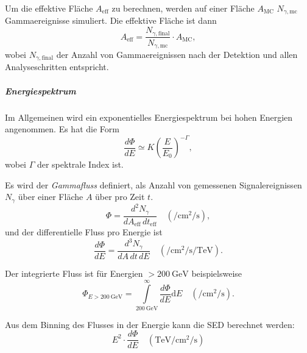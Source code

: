 Um die effektive Fläche $A_{\text{eff}}$ zu berechnen,
werden auf einer Fläche $A_{\text{MC}}$ $N_{\gamma,\text{mc}}$ Gammaereignisse simuliert.
Die effektive Fläche ist dann
\begin{equation}%
  \label{eq:effective_area}
  A_{\text{eff}} =
    \frac{N_{\gamma,\text{final}}}{N_{\gamma,\text{mc}}}
    \cdot A_{\text{MC}} ,
\end{equation}
wobei $N_{\gamma,\text{final}}$ der Anzahl von Gammaereignissen nach der Detektion
und allen Analyseschritten entspricht.



\subparagraph{Energiespektrum}

Im Allgemeinen wird ein exponentielles Energiespektrum bei hohen Energien
angenommen. 
Es hat die Form 
\begin{equation}%
  \label{eq:photon_index}
  \frac{d\Phi}{dE} \simeq K {\left(\frac{E}{E_0}\right)}^{-\Gamma},
\end{equation}
wobei $\Gamma$ der spektrale Index ist.

Es wird der \textit{Gammafluss} definiert,
als Anzahl von gemessenen Signalereignissen $N_{\gamma}$
über
einer Fläche $A$ über pro Zeit $t$.
\begin{equation}%
  \label{eq:gamma_flux}
  \Phi = \frac{d^2 N_{\gamma}}{dA_{\text{eff}}\, dt_{\text{eff}}}
  \quad \left(\si{\per\centi\meter\tothe2\per\second}\right),
\end{equation}
und der differentielle Fluss pro Energie ist
\begin{equation}%
  \label{eq:differential_energy_spectrum}
  \frac{d\Phi}{dE} = \frac{d^3N_{\gamma}}{dA\, dt\, dE}
  \quad \left(\si{\per\centi\meter\tothe2\per\second\per\tera\electronvolt}\right).
\end{equation}

Der integrierte Fluss ist für Energien $> \SI{200}{\giga\electronvolt}$
beispielsweise
\begin{equation}%
  \label{eq:integral_flux}
  \Phi_{E > \SI{200}{\giga\electronvolt}} =
    \int\limits_{\SI{200}{\giga\electronvolt}}^{\infty} \frac{d \Phi}{dE}
    \text{d} E
  \quad \left(\si{\per\centi\meter\tothe2\per\second}\right).
\end{equation}

Aus dem Binning des Flusses in der Energie
kann die SED berechnet werden:
\begin{equation}%
  \label{eq:spectral_energy_distribution}
  E^2 \cdot \frac{d \Phi}{dE}
  \quad \left(\si{\tera\electronvolt\per\centi\meter\tothe2\per\second}\right)
\end{equation}

